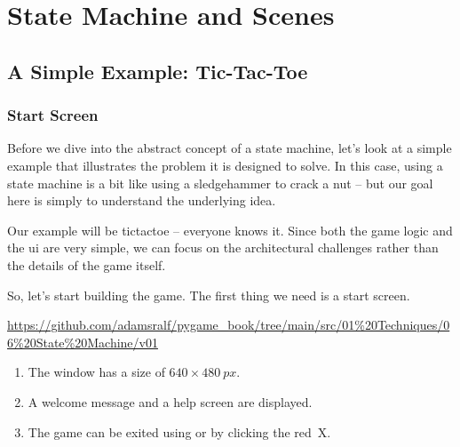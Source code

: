 \newpage
\section{State Machine and Scenes}\label{secStateMachine}

\subsection{A Simple Example: Tic-Tac-Toe}

\subsubsection{Start Screen}

\begin{figure}%
	\begin{center}%
		\vspace{-2em}%
	\end{center}%
\end{figure}%
Before we dive into the abstract concept of a state machine, let's look at a simple example that illustrates the problem it is designed to solve. In this case, using a state machine is a bit like using a sledgehammer to crack a nut -- but our goal here is simply to understand the underlying idea.

Our example will be \Gls{tictactoe} -- everyone knows it. Since both the game logic and the \Gls{ui} are very simple, we can focus on the architectural challenges rather than the details of the game itself.

So, let's start building the game. The first thing we need is a start screen.
 

\begin{diskbox}
	\url{https://github.com/adamsralf/pygame_book/tree/main/src/01%20Techniques/06%20State%20Machine/v01}
\end{diskbox}

\begin{enumerate}
	\item The window has a size of $640\times \SI{480}{px}$.\label{reqTicTacToeStartSize}
	\item A welcome message and a help screen are displayed.\label{reqTicTacToeStartText}
	\item The game can be exited using \keys{\esc} or by clicking the red~X.\label{reqTicTacToeStartQuit}
\end{enumerate}
\er


